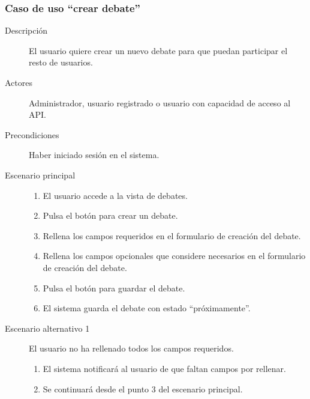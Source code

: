 \subsubsection{Caso de uso ``crear debate''}
\begin{description}
\item[Descripción] El usuario quiere crear un nuevo debate para que puedan participar el resto de usuarios.
\item[Actores] Administrador, usuario registrado o usuario con capacidad de acceso al API.
\item[Precondiciones] Haber iniciado sesión en el sistema.
\item[Escenario principal] \hfill
						 	\begin{enumerate}
							\item El usuario accede a la vista de debates.
							\item Pulsa el botón para crear un debate.
							\item Rellena los campos requeridos en el formulario de creación del debate.
							\item Rellena los campos opcionales que considere necesarios en el formulario de creación del debate.
							\item Pulsa el botón para guardar el debate.
							\item El sistema guarda el debate con estado ``próximamente''.
							\end{enumerate}
\item[Escenario alternativo 1] El usuario no ha rellenado todos los campos requeridos.
							\begin{enumerate}
							\item El sistema notificará al usuario de que faltan campos por rellenar.
							\item Se continuará desde el punto 3 del escenario principal.
							\end{enumerate}
\end{description}


